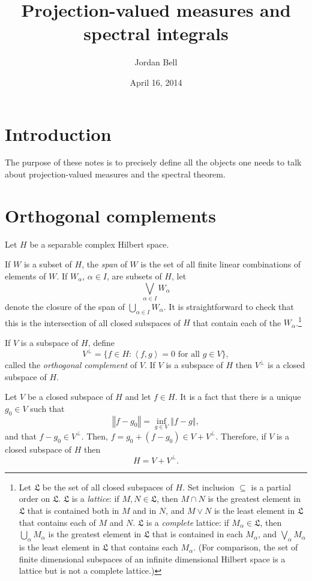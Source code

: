 \documentclass{article}
\newcommand{\inner}[2]{\left\langle #1, #2 \right\rangle}
\newcommand{\norm}[1]{\left\Vert #1 \right\Vert}
\begin{document}
\title{Projection-valued measures and spectral integrals}
\author{Jordan Bell}
\date{April 16, 2014}
\maketitle

\section{Introduction}
The purpose of these notes is to precisely define all the objects one needs to talk about projection-valued measures and the spectral theorem. 




\section{Orthogonal complements}
Let $H$ be a separable complex Hilbert space. 

If $W$ is a subset of $H$, the {\em span} of $W$ is the set of all finite linear combinations of elements of $W$. 
If $W_\alpha$, $\alpha \in I$, are subsets of $H$, let 
\[
\bigvee_{\alpha \in I} W_\alpha
\]
denote the closure of the span of $\bigcup_{\alpha \in I} W_\alpha$. It is straightforward to check that this is the intersection of all closed subspaces of $H$ that contain each of the $W_\alpha$.\footnote{Let $\mathfrak{L}$ be the set of all closed subspaces of $H$. Set inclusion $\subseteq$ is a partial order on $\mathfrak{L}$. $\mathfrak{L}$ is 
a {\em lattice}: if $M,N \in \mathfrak{L}$, then $M \cap N$ is the greatest element in $\mathfrak{L}$ that is contained both in $M$ and in $N$, and
$M \vee N$ is the least element in $\mathfrak{L}$ that contains each of $M$ and $N$. $\mathfrak{L}$ is a {\em complete} lattice: if $M_\alpha \in \mathfrak{L}$,
then $\bigcup_\alpha M_\alpha$ is the greatest element in $\mathfrak{L}$ that is contained in each $M_\alpha$, and 
$\bigvee_\alpha M_\alpha$ is the least element in $\mathfrak{L}$ that contains each $M_\alpha$. (For comparison, the set of finite dimensional subspaces of an infinite
dimensional Hilbert space is a lattice but is not a complete lattice.)}

If $V$ is a subspace of $H$, define
\[
V^\perp=\{f \in H: \textrm{$\inner{f}{g}=0$ for all $g \in V$}\},
\]
called the {\em orthogonal complement} of $V$.
If $V$ is a subspace of $H$ then $V^\perp$ is a closed subspace of $H$.



Let $V$ be a closed subspace of $H$ and let $f \in H$. It is a fact that there is a unique $g_0 \in V$ such that 
\[
\norm{f-g_0}=\inf_{g \in V} \norm{f-g},
\]
and that $f - g_0 \in V^\perp$. 
Then, $f=g_0+(f-g_0) \in V+V^\perp$. Therefore, if
$V$ is a closed subspace of $H$ then
\begin{equation}
\label{Hdecomp}
H=V + V^\perp.
\end{equation}
\end{document}

